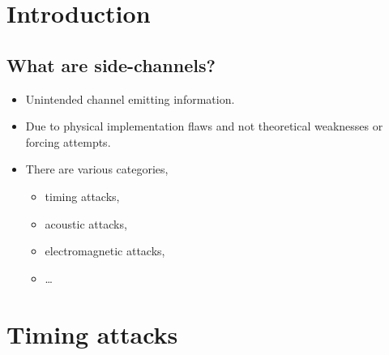 \mode*




\section{Introduction}

\subsection{What are side-channels?}

\begin{frame}
  \begin{definition}
    \begin{itemize}
      \item Unintended channel emitting information.
      \item Due to physical implementation flaws and not theoretical weaknesses 
        or forcing attempts.
    \end{itemize}
  \end{definition}
\end{frame}

\begin{frame}
  \begin{itemize}
    \item There are various categories, \eg
      \begin{itemize}
        \item timing attacks,
        \item acoustic attacks,
        \item electromagnetic attacks,
        \item \dots
      \end{itemize}
  \end{itemize}
\end{frame}


\section{Timing attacks}

